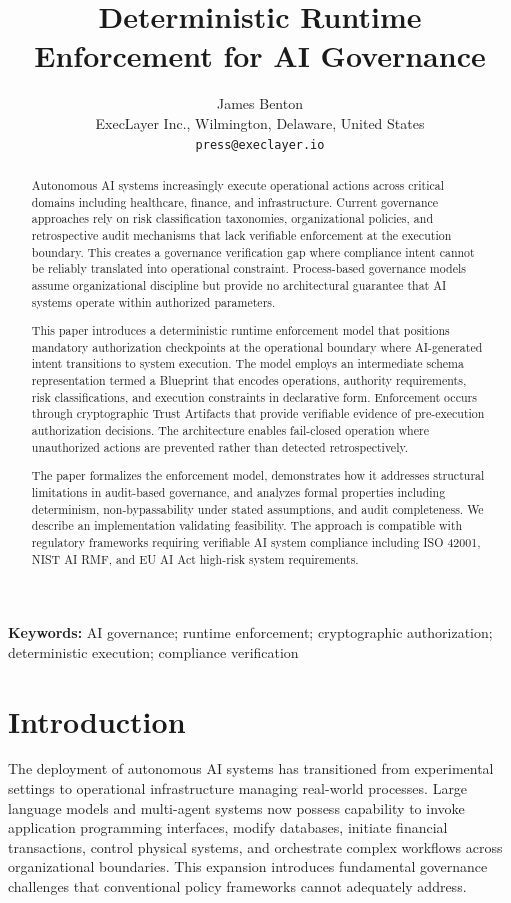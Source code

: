 \documentclass[11pt,letterpaper]{article}
\title{Deterministic Runtime Enforcement for AI Governance}
\author{
  James Benton \\
  ExecLayer Inc., Wilmington, Delaware, United States \\
  \texttt{press@execlayer.io}
}
\date{}
\begin{document}
\maketitle

\begin{abstract}
Autonomous AI systems increasingly execute operational actions across critical domains including healthcare, finance, and infrastructure. Current governance approaches rely on risk classification taxonomies, organizational policies, and retrospective audit mechanisms that lack verifiable enforcement at the execution boundary. This creates a governance verification gap where compliance intent cannot be reliably translated into operational constraint. Process-based governance models assume organizational discipline but provide no architectural guarantee that AI systems operate within authorized parameters.

This paper introduces a deterministic runtime enforcement model that positions mandatory authorization checkpoints at the operational boundary where AI-generated intent transitions to system execution. The model employs an intermediate schema representation termed a Blueprint that encodes operations, authority requirements, risk classifications, and execution constraints in declarative form. Enforcement occurs through cryptographic Trust Artifacts that provide verifiable evidence of pre-execution authorization decisions. The architecture enables fail-closed operation where unauthorized actions are prevented rather than detected retrospectively.

The paper formalizes the enforcement model, demonstrates how it addresses structural limitations in audit-based governance, and analyzes formal properties including determinism, non-bypassability under stated assumptions, and audit completeness. We describe an implementation validating feasibility. The approach is compatible with regulatory frameworks requiring verifiable AI system compliance including ISO 42001, NIST AI RMF, and EU AI Act high-risk system requirements.
\end{abstract}

\noindent\textbf{Keywords:} AI governance; runtime enforcement; cryptographic authorization; deterministic execution; compliance verification

\section{Introduction}

The deployment of autonomous AI systems has transitioned from experimental settings to operational infrastructure managing real-world processes. Large language models and multi-agent systems now possess capability to invoke application programming interfaces, modify databases, initiate financial transactions, control physical systems, and orchestrate complex workflows across organizational boundaries. This expansion introduces fundamental governance challenges that conventional policy frameworks cannot adequately address.
\end{document}
